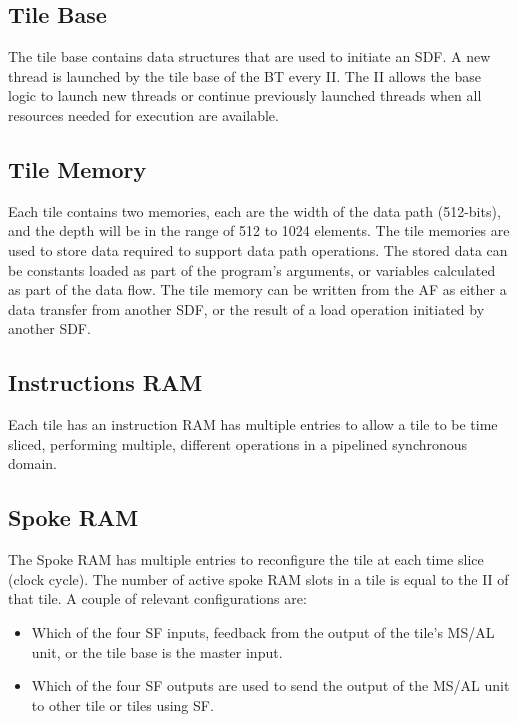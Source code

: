 \subsection{Tile Base}
The tile base contains data structures that are used to initiate an SDF.
A new thread is launched by the tile base of the BT every II.
The II allows the base logic to launch new threads or continue previously launched threads when all resources needed for execution are available.

\subsection{Tile Memory}
Each tile contains two memories, each are the width of the data path (512-bits), and the depth will be in the range of 512 to 1024 elements.
The tile memories are used to store data required to support data path operations.
The stored data can be constants loaded as part of the program's arguments, or variables calculated as part of the data flow.
The tile memory can be written from the AF as either a data transfer from another SDF, or the result of a load operation initiated by another SDF.

\subsection{Instructions RAM}
Each tile has an instruction RAM has multiple entries to allow a tile to be time sliced, performing multiple, different operations in a pipelined synchronous domain.

\subsection{Spoke RAM}
The Spoke RAM has multiple entries to reconfigure the tile at each time slice (clock cycle).
The number of active spoke RAM slots in a tile is equal to the II of that tile.
A couple of relevant configurations are: 

\begin{itemize}
  \item Which of the four SF inputs, feedback from the output of the tile's MS/AL unit, or the tile base is the master input.
  \item Which of the four SF outputs are used to send the output of the MS/AL unit to other tile or tiles using SF.
\end{itemize}


